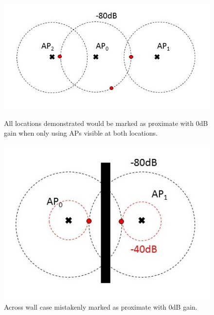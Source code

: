 \documentclass{UoYCSproject}
\begin{document}
            \begin{figure}[h]
            	\centering
            	\begin{minipage}{0.45\textwidth}
            		\centering
            		\includegraphics[width=\textwidth]{single_overlap.jpg}
            		\caption{All locations demonstrated would be marked as proximate with $0$dB gain when only using APs visible at both locations.}
            	\end{minipage}\hfill
            	\begin{minipage}{0.45\textwidth}
            		\centering
            		\includegraphics[width=1\textwidth]{wall.jpg}
            		\caption{Across wall case mistakenly marked as proximate with $0$dB gain.}
            	\end{minipage}
            \end{figure}
            
\end{document}
